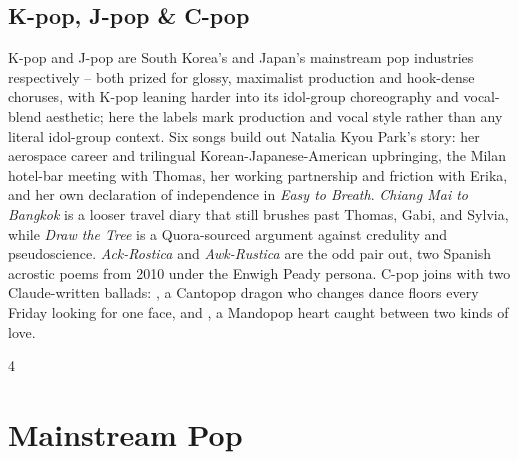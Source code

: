 \documentclass[a4paper,landscape]{memoir}
\begin{document}
\chapter{K-pop, J-pop \& C-pop}
K-pop and J-pop are South Korea's and Japan's mainstream pop industries respectively -- both prized for glossy, maximalist production and hook-dense choruses, with K-pop leaning harder into its idol-group choreography and vocal-blend aesthetic; here the labels mark production and vocal style rather than any literal idol-group context. Six songs build out Natalia Kyou Park's story: her aerospace career and trilingual Korean-Japanese-American upbringing, the Milan hotel-bar meeting with Thomas, her working partnership and friction with Erika, and her own declaration of independence in \emph{Easy to Breath}. \emph{Chiang Mai to Bangkok} is a looser travel diary that still brushes past Thomas, Gabi, and Sylvia, while \emph{Draw the Tree} is a Quora-sourced argument against credulity and pseudoscience. \emph{Ack-Rostica} and \emph{Awk-Rustica} are the odd pair out, two Spanish acrostic poems from 2010 under the Enwigh Peady persona. C-pop joins with two Claude-written ballads: \emph{}, a Cantopop dragon who changes dance floors every Friday looking for one face, and \emph{}, a Mandopop heart caught between two kinds of love.
\clearpage\begin{multicols*}{4}
\end{multicols*}

\part{Mainstream Pop}
\end{document}
